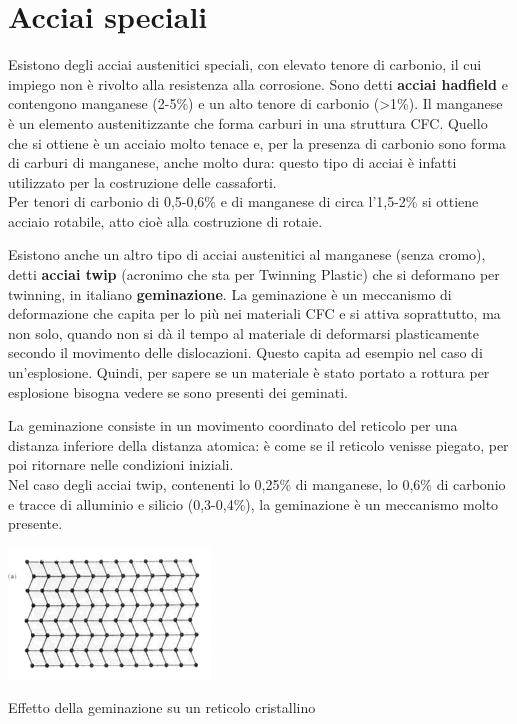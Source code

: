 \section{Acciai speciali}

Esistono degli acciai austenitici speciali, con elevato tenore di carbonio, il cui impiego non è rivolto alla resistenza alla corrosione. Sono detti \textbf{acciai hadfield} e contengono manganese (2-5\%) e un alto tenore di carbonio (>1\%). Il manganese è un elemento austenitizzante che forma carburi in una struttura CFC. Quello che si ottiene è un acciaio molto tenace e, per la presenza di carbonio sono forma di carburi di manganese, anche molto dura: questo tipo di acciai è infatti utilizzato per la costruzione delle cassaforti.\\
Per tenori di carbonio di 0,5-0,6\% e di manganese di circa l’1,5-2\% si ottiene acciaio rotabile, atto cioè alla costruzione di rotaie.

Esistono anche un altro tipo di acciai austenitici al manganese (senza cromo), detti \textbf{acciai twip} (acronimo che sta per Twinning Plastic) che si deformano per twinning, in italiano \textbf{geminazione}. La geminazione è un meccanismo di deformazione che capita per lo più nei materiali CFC e si attiva soprattutto, ma non solo, quando non si dà il tempo al materiale di deformarsi plasticamente secondo il movimento delle dislocazioni. Questo capita ad esempio nel caso di un’esplosione. Quindi, per sapere se un materiale è stato portato a rottura per esplosione bisogna vedere se sono presenti dei geminati.

La geminazione consiste in un movimento coordinato del reticolo per una distanza inferiore della distanza atomica: è come se il reticolo venisse piegato, per poi ritornare nelle condizioni iniziali.\\
Nel caso degli acciai twip, contenenti lo 0,25\% di manganese, lo 0,6\% di carbonio e tracce di alluminio e silicio (0,3-0,4\%), la geminazione è un meccanismo molto presente.
\begin{marginfigure}[-5.5cm]
\includegraphics{images/img36.png}
\caption{Effetto della geminazione su un reticolo cristallino}
\end{marginfigure}

